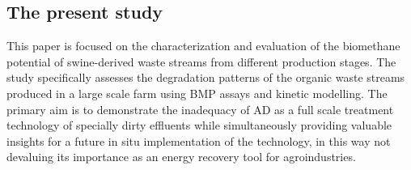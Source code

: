 \subsection{The present study}
This paper is focused on the characterization and evaluation of the biomethane potential of swine-derived  waste streams from different production stages. The study specifically assesses the degradation patterns of the organic waste streams produced in a large scale farm using BMP assays and kinetic modelling. The primary aim is to demonstrate the inadequacy of AD as a full scale treatment technology of specially dirty effluents while simultaneously providing valuable insights for a future in situ implementation of the technology, in this way not devaluing its importance as an energy recovery tool for agroindustries.